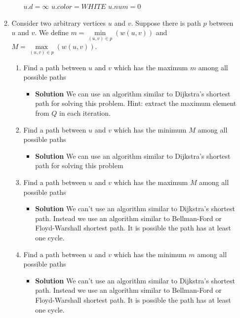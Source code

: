 \documentclass{book}
\begin{document}
\begin{enumerate}
\begin{enumerate}
\begin{itemize}
\begin{algorithm*}[h!]
			\end{algorithm*}
			\begin{algorithm*}[h!]
				\begin{algorithmic}
							\State $u.d = \infty$
							\State $u.color = WHITE$
							\State $u.num = 0$
						\EndFor
					\EndFunction
				\end{algorithmic}
			\end{algorithm*}
			\FloatBarrier
		\end{itemize}
		\item Consider two arbitrary vertices $u$ and $v$. Suppose there is path $p$ between $u$ and $v$. We define $m = \min\limits_{(u, v) \in p}(w(u, v))$ and $M = \max\limits_{(u, v) \in p}(w(u, v))$.
		\begin{enumerate}
			\item Find a path between $u$ and $v$ which has the maximum $m$ among all possible paths
			\begin{itemize}
				\item \textbf{Solution} We can use an algorithm similar to Dijkstra's shortest path for solving this problem. Hint: extract the maximum element from $Q$ in each iteration.
			\end{itemize}
			\item Find a path between $u$ and $v$ which has the minimum $M$ among all possible paths
			\begin{itemize}
				\item \textbf{Solution} We can use an algorithm similar to Dijkstra's shortest path for solving this problem
			\end{itemize}			
			\item Find a path between $u$ and $v$ which has the maximum $M$ among all possible paths
			\begin{itemize}
				\item \textbf{Solution} We can't use an algorithm similar to Dijkstra's shortest path. Instead we use an algorithm similar to Bellman-Ford or Floyd-Warshall shortest path. It is possible the path has at least one cycle.
			\end{itemize}
			\item Find a path between $u$ and $v$ which has the minimum $m$ among all possible paths
			\begin{itemize}
				\item \textbf{Solution} We can't use an algorithm similar to Dijkstra's shortest path. Instead we use an algorithm similar to Bellman-Ford or Floyd-Warshall shortest path. It is possible the path has at least one cycle.

\end{itemize}
\end{enumerate}
\end{enumerate}
\end{enumerate}
\end{document}
